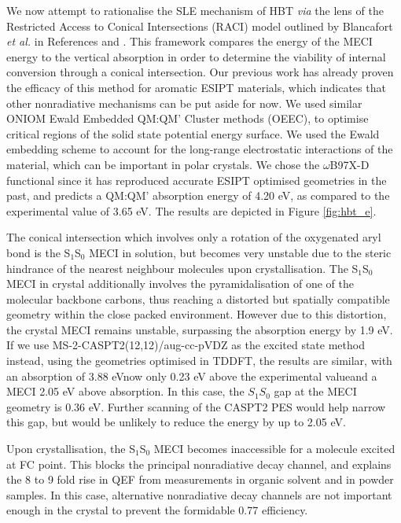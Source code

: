 We now attempt to rationalise the SLE mechanism of HBT \textit{via} the lens of the Restricted Access to Conical Intersections (RACI) model outlined by Blancafort \textit{et al.} in References  and . This framework compares the energy of the MECI energy to the vertical absorption in order to determine the viability of internal conversion through a conical intersection. Our previous work has already proven the efficacy of this method for aromatic ESIPT materials, which indicates that other nonradiative mechanisms can be put aside for now.\cite{Dommett2017a,Dommett2019} We used similar ONIOM Ewald Embedded QM:QM' Cluster methods (OEEC), to optimise critical regions of the solid state potential energy surface. We used the Ewald embedding scheme to account for the long-range electrostatic interactions of the material, which can be important in polar crystals. We chose the $\omega$B97X-D functional since it has reproduced accurate ESIPT optimised geometries in the past, and predicts a QM:QM' absorption energy of 4.20 eV, as compared to the experimental value of 3.65 eV. The results are depicted in Figure \ref{fig:hbt_e}.

The conical intersection which involves only a rotation of the oxygenated aryl bond is the S$_1$\textendash{}S$_0$ MECI in solution, but becomes very unstable due to the steric hindrance of the nearest neighbour molecules upon crystallisation. The S$_1$\textendash{}S$_0$ MECI in crystal additionally involves the pyramidalisation of one of the molecular backbone carbons, thus reaching a distorted but spatially compatible geometry within the close packed environment. However due to this distortion, the crystal MECI remains unstable, surpassing the absorption energy by 1.9 eV. If we use MS-2-CASPT2(12,12)/aug-cc-pVDZ as the excited state method instead, using the geometries optimised in TDDFT, the results are similar, with an absorption of 3.88 eV\textemdash{}now only 0.23 eV above the experimental value\textemdash{}and a MECI 2.05 eV above absorption. In this case, the $S_1$\textendash{}$S_0$ gap at the MECI geometry is 0.36 eV. Further scanning of the CASPT2 PES would help narrow this gap, but would be unlikely to reduce the energy by up to 2.05 eV.

Upon crystallisation, the S$_1$\textendash{}S$_0$ MECI becomes inaccessible for a molecule excited at FC point. This blocks the principal nonradiative decay channel, and explains the 8 to 9 fold rise in QEF from measurements in organic solvent and in powder samples. In this case, alternative nonradiative decay channels are not important enough in the crystal to prevent the formidable 0.77 efficiency.

